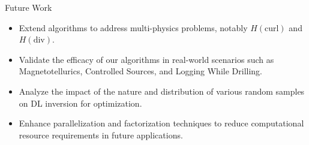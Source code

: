 \begin{frame}{Future Work}

\begin{itemize}
  \item Extend algorithms to address multi-physics problems, notably \( H(\text{curl}) \) and \( H(\text{div}) \).
  \item Validate the efficacy of our algorithms in real-world scenarios such as Magnetotellurics, Controlled Sources, and Logging While Drilling.
  \item Analyze the impact of the nature and distribution of various random samples on DL inversion for optimization.
  \item Enhance parallelization and factorization techniques to reduce computational resource requirements in future applications.
\end{itemize}

\end{frame}
